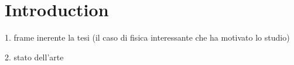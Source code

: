 \chapter{Introduction}




1. frame inerente la tesi (il caso di fisica interessante che ha motivato lo studio)

2. stato dell'arte

